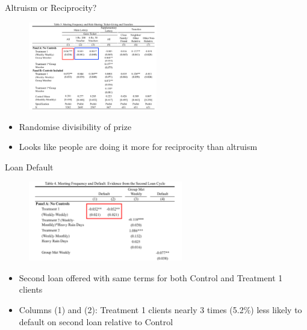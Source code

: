\documentclass[11pt,notes=hide,aspectratio=169,mathserif]{beamer}
\begin{document}
\begin{frame}{Altruism or Reciprocity?}
\begin{figure}
    \centering
    \includegraphics[width=0.5\textwidth]{inputs/table3.png}
\end{figure}
\begin{itemize}
    \item Randomise divisibility of prize 
    \pause \item Looks like people are doing it more for reciprocity than altruism 
\end{itemize}
\end{frame}

\begin{frame}{Loan Default}
\begin{figure}
    \centering
    \includegraphics[width=0.6\textwidth]{inputs/table4.png}
\end{figure}
\begin{itemize}
    \pause \item Second loan offered with same terms for both Control and Treatment 1 clients
    \pause \item Columns (1) and (2): Treatment 1 clients nearly 3 times (5.2\%) less likely to default on second loan relative to Control 
\end{itemize}
\end{frame}
\end{document}
